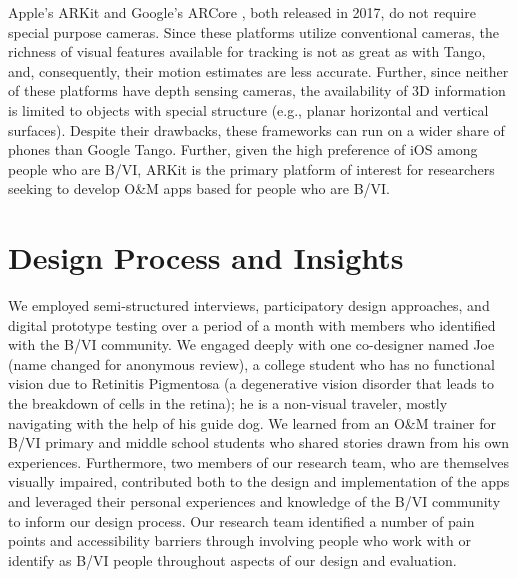 \documentclass[chi_draft]{sigchi}
\newcommand{\BVI}{B/VI\xspace}
\newcommand{\OM}{O\&M\xspace}
\begin{document}
Apple's ARKit \cite{arkit} and Google's ARCore \cite{arcore}, both released in 2017, do not require special purpose cameras.  Since these platforms utilize conventional cameras, the richness of visual features available for tracking is not as great as with Tango, and, consequently, their motion estimates are less accurate.  Further, since neither of these platforms have depth sensing cameras, the availability of 3D information is limited to objects with special structure (e.g., planar horizontal and vertical surfaces).  Despite their drawbacks, these frameworks can run on a wider share of phones than Google Tango.  Further, given the high preference of iOS among people who are \BVI \cite{morris2014blind}, ARKit is the primary platform of interest for researchers seeking to develop \OM apps based for people who are \BVI.


\section{Design Process and Insights}
We employed semi-structured interviews, participatory design approaches, and digital prototype testing over a period of a month with members who identified with the \BVI community.  We engaged deeply with one co-designer named Joe (name changed for anonymous review), a college student who has no functional vision due to Retinitis Pigmentosa (a degenerative vision disorder that leads to the breakdown of cells in the retina); he is a non-visual traveler, mostly navigating with the help of his guide dog. We learned from an \OM trainer for \BVI primary and middle school students who shared stories drawn from his own experiences. Furthermore, two members of our research team, who are themselves visually impaired, contributed both to the design and implementation of the apps and leveraged their personal experiences and knowledge of the \BVI community to inform our design process. Our research team identified a number of pain points and accessibility barriers through involving people who work with or identify as \BVI people throughout aspects of our design and evaluation.
\end{document}
